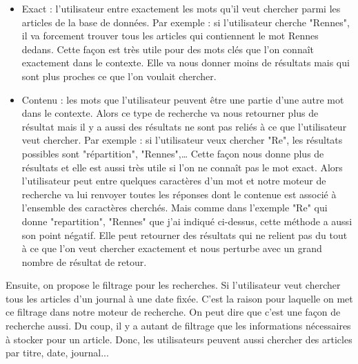 \begin{itemize}
\item Exact : l'utilisateur entre exactement les mots qu'il veut chercher parmi les articles de la base de données. Par exemple : si l'utilisateur cherche "Rennes", il va forcement trouver tous les articles qui contiennent le mot Rennes dedans. Cette façon est très utile pour des mots clés que l’on connaît exactement dans le contexte. Elle va nous donner moins de résultats mais qui sont plus proches ce que l’on voulait chercher.
\item Contenu : les mots que l'utilisateur peuvent être une partie d'une autre mot dans le contexte. Alors ce type de recherche va nous retourner plus de résultat mais il y a aussi des résultats ne sont pas reliés à ce que l'utilisateur veut chercher. Par exemple : si l'utilisateur veux chercher "Re", les résultats possibles sont "répartition", "Rennes",… Cette façon nous donne plus de résultats et elle est aussi très utile si l’on ne connaît pas le mot exact. Alors l’utilisateur peut entre quelques caractères d’un mot et notre moteur de recherche va lui renvoyer toutes les réponses dont le contenue est associé à l’ensemble des caractères cherchés. Mais comme dans l’exemple "Re" qui donne "repartition", "Rennes" que j’ai indiqué ci-dessus, cette méthode a aussi son point négatif. Elle peut retourner des résultats qui ne relient pas du tout à ce que l’on veut chercher exactement et nous perturbe avec un grand nombre de résultat de retour.
\end{itemize}

	Ensuite, on propose le filtrage pour les recherches. Si l'utilisateur veut chercher tous les articles d’un journal à une date fixée. C’est la raison pour laquelle on met ce filtrage dans notre moteur de recherche. On peut dire que c’est une façon de recherche aussi. Du coup, il y a autant de filtrage que les informations nécessaires à stocker pour un article. Donc, les utilisateurs peuvent aussi chercher des articles par titre, date, journal... %
 

